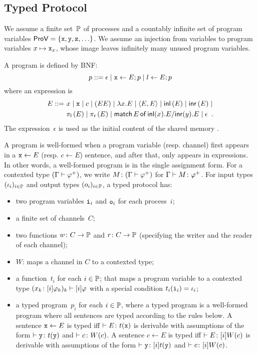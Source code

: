 { 

\subsection{Typed Protocol}

We assume a finite set~$\mathbb{P}$
of processes and a countably infinite
set of program variables $\mathsf{ProV} =\{\texttt{x}, \texttt{y}, \texttt{z}, \ldots\}$.
We assume an injection from variables to program variables $x\mapsto
\texttt{x}_x$, whose image leaves infinitely many unused program variables.

A program is defined by BNF:
\[
 p ::= \epsilon\mid
 \texttt{x}\leftarrow E; p \mid
 l \leftarrow E; p
\]
where an expression is
\begin{align*}
 E
 ::=\,\,
 &x\mid \texttt{x} \mid c \mid (EE)\mid \lambda
 x.E\mid \langle{E,E}\rangle\mid \mathsf{inl}\left({E}\right)\mid \mathsf{inr}\left({E}\right)\mid \\
 &\pi_{\mathsf l}\left({E}\right)\mid\pi_{\mathsf r}\left({E}\right)\mid  \mathsf{match}\,{E}\,\mathsf{of}\, \mathsf{inl}({x}). {E}/ \mathsf{inr}({y}). {E}\mid \epsilon\enspace.
\end{align*}
The expression~$\epsilon$ is used as the initial content of the shared
memory .

\newcommand{\Wg}{W_{\mathrm g}}
\newcommand{\Wd}{W_{\mathrm d}}
A program is well-formed when
a program variable (resp. channel) first appears in a $\texttt{x}\leftarrow E$
(resp. $c\leftarrow E$)
sentence, and
after that, only appears in expressions.
In other words, a well-formed program is in the single assignment form.
For a contexted type $(\Gamma\vdash{\varphi}^+)$,
we write ${M} \colon{(\Gamma\vdash{\varphi}^+)}$ for
$\Gamma\vdash{M} \colon{{\varphi}^+}$.
For input types $(\iota_i)_{i\in\mathbb{P}}$
and output types $(o_i)_{i\in\mathbb{P}}$,
a typed protocol has:
\begin{itemize}
 \item two program variables
      $\texttt{i}_i$ and $\texttt{o}_i$ for each process~$i$;
 \item a finite set of channels~$C$;
 \item two functions $w\colon C\rightarrow \mathbb{P}$
       and $r\colon C\rightarrow
       \mathbb{P}$ (specifying the writer and the reader of
       each channel);
 \item $W$: maps a channel in $C$ to a contexted type;
 \item a function~$t_i$ for each $i\in \mathbb{P}$;
       that maps a program variable to a contexted type
       $({x_k} \colon{[i]\varphi_k})_k \vdash[i]\varphi$ with a special condition
       $t_i(\texttt{i}_i)= \iota_i$;
 \item a typed program~$p_i$ for each $i\in \mathbb{P}$, where
       a typed program is a well-formed program where all
       sentences are typed according to the rules below.
       A sentence $\texttt{x} \leftarrow E$ is typed  iff $\vdash E\colon t(\texttt{x})$ is derivable with assumptions of the form $\vdash{\texttt{y}} \colon{t(\texttt{y})}$ and $\vdash{c} \colon{W(c)}$.
       A sentence $c\leftarrow E$ is typed iff
       $\vdash{E} \colon{[i]W(c)}$ is derivable with
       assumptions of the form $\vdash{\texttt{y}} \colon{[i]t(\texttt{y})}$ and
       $\vdash{c} \colon{[i]W(c)}$.
\end{itemize}

}
